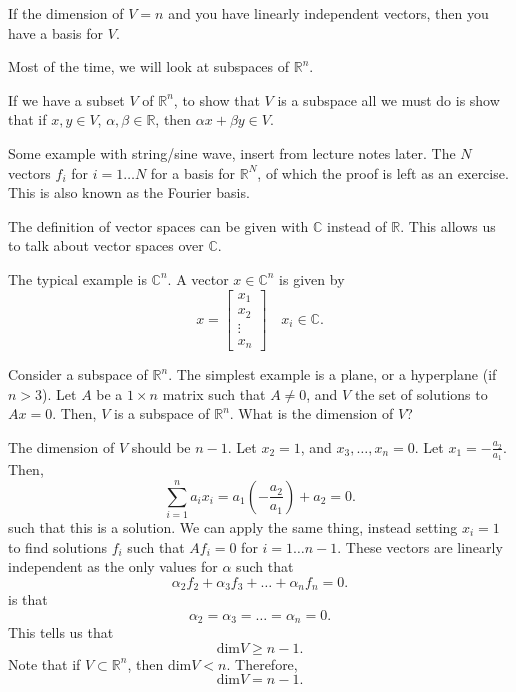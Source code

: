 
If the dimension of \( V = n \) and you have linearly independent vectors, then you have a basis for \( V \).

Most of the time, we will look at subspaces of \( \mathbb{R}^{n}  \).

\begin{note}
	If we have a subset \( V \) of \( \mathbb{R}^{n}  \), to show that \( V \) is a subspace all we must do is show that if \( x,y \in V \), \( \alpha ,\beta \in \mathbb{R} \), then \( \alpha x+\beta y \in V \).
\end{note}

\begin{eg}
	Some example with string/sine wave, insert from lecture notes later. The \( N \) vectors \( f_i \) for \( i=1\ldots N \) for a basis for \( \mathbb{R}^{N}  \), of which the proof is left as an exercise. This is also known as the Fourier basis.
\end{eg}

The definition of vector spaces can be given with \( \mathbb{C} \) instead of \( \mathbb{R} \). This allows us to talk about vector spaces over \( \mathbb{C} \).

\begin{eg}
	The typical example is \( \mathbb{C}^{n}  \). A vector \( x \in \mathbb{C}^{n}  \) is given by \[
		x = \begin{bmatrix}
			x_{1} \\ x_{2} \\ \vdots \\ x_n
		\end{bmatrix} \quad x_i \in \mathbb{C}
	.\] 
\end{eg}

Consider a subspace of \( \mathbb{R}^{n}  \). The simplest example is a plane, or a hyperplane (if \( n>3 \)). Let \( A \) be a \( 1\times n \) matrix such that \( A\neq 0 \), and \( V \) the set of solutions to \( Ax=0 \). Then, \( V \) is a subspace of \( \mathbb{R}^{n}  \). What is the dimension of \( V \)?

The dimension of \( V \) should be \( n-1 \). Let \( x_{2}=1 \), and \( x_{3},\ldots ,x_n =0\). Let \( x_{1} = -\frac{a_{2}}{a_{1}} \). Then, \[
	\sum_{i=1}^{n} a_i x_i = a_1 \left( -\frac{a_{2}}{a_{1}} \right) + a_{2} = 0
.\] such that this is a solution. We can apply the same thing, instead setting \( x_i=1 \) to find solutions \( f_i \) such that \( Af_i=0 \) for \( i=1\ldots n-1 \). These vectors are linearly independent as the only values for \( \alpha  \) such that \[
	\alpha_2 f_{2} + \alpha _3f_{3} + \ldots  + \alpha _n f_n = 0
.\] is that \[
	\alpha _2 = \alpha _3 = \ldots  = \alpha _n = 0
.\] This tells us that \[
	\text{dim} V \ge n-1
.\] Note that if \( V \subset \mathbb{R}^{n}  \), then \( \text{dim}V < n \). Therefore, \[
	\text{dim}V = n-1
.\] 

